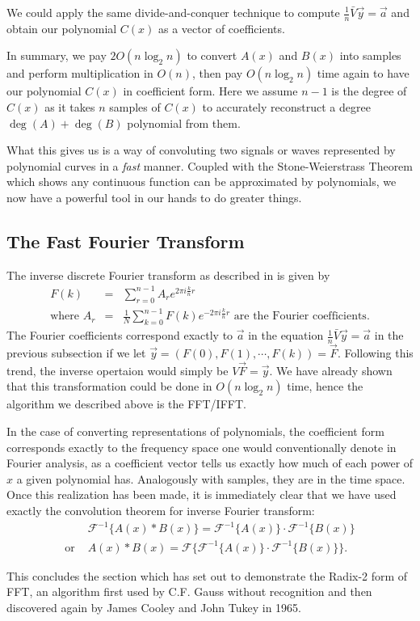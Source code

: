 \documentclass[../article.tex]{subfiles}
\begin{document}
We could apply the same divide-and-conquer technique to compute $\frac{1}{n}\bar{V}\vec{y} = \vec{a}$ and obtain our polynomial $C(x)$ as a vector of coefficients.

In summary, we pay $2O(n\log_2{n})$ to convert $A(x)$ and $B(x)$ into samples and perform multiplication in $O(n)$, then pay $O(n\log_2{n})$ time again to have our polynomial $C(x)$ in coefficient form. Here we assume $n-1$ is the degree of $C(x)$ as it takes $n$ samples of $C(x)$ to accurately reconstruct a degree $\deg(A)+\deg(B)$ polynomial from them.

What this gives us is a way of convoluting two signals or waves represented by polynomial curves in a \emph{fast} manner. Coupled with the Stone-Weierstrass Theorem which shows any continuous function can be approximated by polynomials, we now have a powerful tool in our hands to do greater things.

\subsection{The Fast Fourier Transform}



The inverse discrete Fourier transform as described in \cite{stein_shakarchi_2003} is given by
\begin{eqnarray*}
	F(k) &=& \displaystyle \sum_{r=0}^{n-1} A_r e^{2\pi i\frac{k}{n}r}\\
	\text{where } A_r &=& \frac{1}{N} \displaystyle \sum_{k=0}^{n-1} F(k) e^{-2\pi i\frac{k}{n}r} \text{ are the Fourier coefficients}.
\end{eqnarray*}
The Fourier coefficients correspond exactly to $\vec{a}$ in the equation $\frac{1}{n}\bar{V}\vec{y}=\vec{a}$ in the previous subsection if we let $\vec{y} = (F(0),F(1),\cdots,F(k)) = \vec{F}$. Following this trend, the inverse opertaion would simply be $V\vec{F} = \vec{y}$. We have already shown that this transformation could be done in $O(n\log_2n)$ time, hence the algorithm we described above is the FFT/IFFT.

In the case of converting representations of polynomials, the coefficient form corresponds exactly to the frequency space one would conventionally denote in Fourier analysis, as a coefficient vector tells us exactly how much of each power of $x$ a given polynomial has. Analogously with samples, they are in the time space. Once this realization has been made, it is immediately clear that we have used exactly the convolution theorem for inverse Fourier transform:
\begin{eqnarray*}
&\mathscr{F}^{-1}\{A(x)*B(x)\} =\mathscr{F}^{-1}\{A(x)\}\cdot\mathscr{F}^{-1}\{B(x)\}\\
\text{or } &A(x)*B(x) =\mathscr{F}\{\mathscr{F}^{-1}\{A(x)\}\cdot\mathscr{F}^{-1}\{B(x)\}\}.
\end{eqnarray*}

This concludes the section which has set out to demonstrate the Radix-2 form of FFT, an algorithm first used by C.F. Gauss without recognition and then discovered again by James Cooley and John Tukey in 1965.
\end{document}
